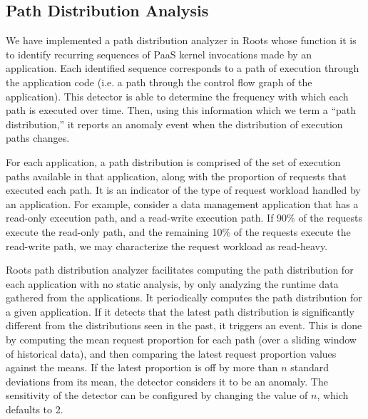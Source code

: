 \subsection{Path Distribution Analysis}

We have implemented a path distribution analyzer
in Roots whose function it is to identify recurring sequences of
PaaS kernel invocations made by an application.
Each identified sequence corresponds to a path of
execution through the application code (i.e. a path through the control flow graph of the application). 
This detector is able to determine the frequency with
which each path is executed over time. Then, using this information which we term
a ``path distribution,'' it reports an anomaly event when the distribution of execution paths
changes. 

For each application,
a path distribution is comprised of the set of execution paths available in
that application, along with the proportion of requests that executed each path.
It is an indicator of the type of request workload handled by an application.
For example, consider a data management application that has a read-only execution path, and a read-write 
execution path. If 90\% of the requests execute the read-only path, and the remaining 10\% of the requests
execute the read-write path, we may characterize the request workload as read-heavy.

%
 
Roots path distribution analyzer facilitates computing the path distribution for each application
with no static analysis, by only analyzing the runtime data gathered from the applications.
It periodically computes the path distribution for a given application.
If it detects that the latest path distribution is significantly different from the distributions seen in the 
past, it triggers an event. This is done by computing the mean request proportion for each path
(over a sliding window of historical data),
and then comparing the latest request proportion values against the means. If the latest proportion
is off by more than $n$ standard deviations from its mean, the detector considers it to be an
anomaly. The sensitivity of the detector can be configured by changing the value of $n$, which
defaults to 2. 

